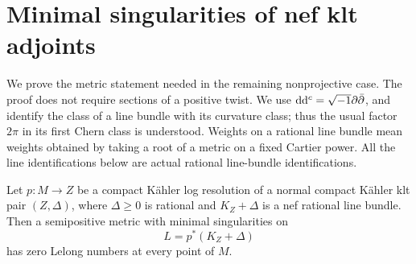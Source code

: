 \section{Minimal singularities of nef klt adjoints}
\label{met:section}

We prove the metric statement needed in the remaining nonprojective
case.  The proof does not require sections of a positive twist.  We use
\(\mathrm{d}\mathrm{d}^{c}=\sqrt{-1}\partial\bar\partial\), and identify the class of a line bundle
with its curvature class; thus the usual factor \(2\pi\) in its first
Chern class is understood.  Weights on a rational line bundle mean
weights obtained by taking a root of a metric on a fixed Cartier power.
All the line identifications below are actual rational line-bundle
identifications.

\begin{lemma}
\label{met:zero-lelong}
Let \(p\colon M\to Z\) be a compact K\"ahler log resolution of a normal
compact K\"ahler klt pair \((Z,\Delta)\), where \(\Delta\geq0\) is rational
and \(K_Z+\Delta\) is a nef rational line bundle.  Then a semipositive
metric with minimal singularities on
\[
 L=p^*(K_Z+\Delta)
\]
has zero Lelong numbers at every point of \(M\).
\end{lemma}

